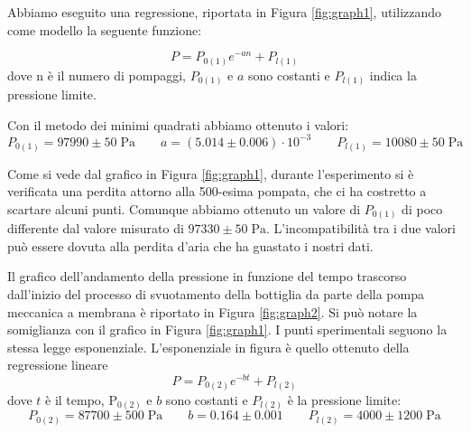 Abbiamo eseguito una regressione, riportata in Figura \ref{fig:graph1}, utilizzando come modello la seguente funzione:

\begin{equation}
    P = P_{0(1)} e^{-an} + P_{l(1)}
\end{equation}
%
dove n è il numero di pompaggi, $P_{0(1)}$ e $a$ sono costanti e $P_{l(1)}$ indica la pressione limite.

Con il metodo dei minimi quadrati abbiamo ottenuto i valori:
\begin{equation}
    P_{0(1)} = 97990 \pm 50 \; \si{\Pa} \qquad a = (5.014 \pm 0.006) \cdot 10^{-3} \qquad P_{l(1)} = 10080 \pm 50\; \si{\Pa}
\end{equation}

Come si vede dal grafico in Figura \ref{fig:graph1},
durante l'esperimento si è verificata una perdita attorno alla 500-esima pompata, che ci ha costretto a scartare alcuni punti.
Comunque abbiamo ottenuto un valore di $P_{0(1)}$ %
di poco differente dal valore misurato di $97330 \pm 50 \; \si{\Pa}$.
L'incompatibilità tra i due valori può essere dovuta alla perdita d'aria che ha guastato i nostri dati.

Il grafico dell'andamento della pressione in funzione del tempo trascorso dall'inizio del processo di svuotamento della bottiglia da parte della pompa meccanica a membrana è riportato in Figura \ref{fig:graph2}. Si può notare la somiglianza con il grafico in Figura \ref{fig:graph1}. I punti sperimentali seguono la stessa legge esponenziale. L'esponenziale in figura è quello ottenuto della regressione lineare
\begin{equation}
    P = P_{0(2)} e^{-bt} + P_{l(2)}
\end{equation}
dove $t$ è il tempo, P$_{0(2)}$ e $b$ sono costanti e $P_{l(2)}$ è la pressione limite:
\begin{equation}
    P_{0(2)} = 87700 \pm 500 \; \si{\Pa} \qquad b = 0.164 \pm 0.001 \qquad P_{l(2)} = 4000 \pm 1200 \; \si{\Pa}
\end{equation}

